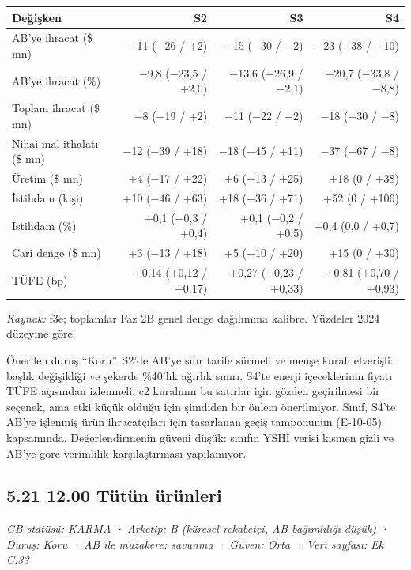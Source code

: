 \begin{longtable}[]{@{}lrrr@{}}
\toprule\noalign{}
\textbf{Değişken} & \textbf{S2} & \textbf{S3} & \textbf{S4} \\
\midrule\noalign{}
\endhead
\bottomrule\noalign{}
\endlastfoot
AB'ye ihracat (\$ mn) & −11 (−26 / +2) & −15 (−30 / −2) & −23 (−38 / −10) \\
AB'ye ihracat (\%) & −9,8 (−23,5 / +2,0) & −13,6 (−26,9 / −2,1) & −20,7 (−33,8 / −8,8) \\
Toplam ihracat (\$ mn) & −8 (−19 / +2) & −11 (−22 / −2) & −18 (−30 / −8) \\
Nihai mal ithalatı (\$ mn) & −12 (−39 / +18) & −18 (−45 / +11) & −37 (−67 / −8) \\
Üretim (\$ mn) & +4 (−17 / +22) & +6 (−13 / +25) & +18 (0 / +38) \\
İstihdam (kişi) & +10 (−46 / +63) & +18 (−36 / +71) & +52 (0 / +106) \\
İstihdam (\%) & +0,1 (−0,3 / +0,4) & +0,1 (−0,2 / +0,5) & +0,4 (0,0 / +0,7) \\
Cari denge (\$ mn) & +3 (−13 / +18) & +5 (−10 / +20) & +15 (0 / +30) \\
TÜFE (bp) & +0,14 (+0,12 / +0,17) & +0,27 (+0,23 / +0,33) & +0,81 (+0,70 / +0,93) \\
\end{longtable}

\endgroup

\emph{Kaynak:} \etiketT{} f3e; toplamlar Faz 2B genel denge dağılımına kalibre. Yüzdeler 2024 düzeyine göre.

Önerilen duruş ``Koru''. S2'de AB'ye sıfır tarife sürmeli ve menşe kuralı elverişli: başlık değişikliği ve şekerde \%40'lık ağırlık sınırı. S4'te enerji içeceklerinin fiyatı TÜFE açısından izlenmeli; c2 kuralının bu satırlar için gözden geçirilmesi bir seçenek, ama etki küçük olduğu için şimdiden bir önlem önerilmiyor. Sınıf, S4'te AB'ye işlenmiş ürün ihracatçıları için tasarlanan geçiş tamponunun (E-10-05) kapsamında. Değerlendirmenin güveni düşük: sınıfın YSHİ verisi kısmen gizli ve AB'ye göre verimlilik karşılaştırması yapılamıyor.

\hypertarget{nace_kartlar_10-12-521-1200-tuxfctuxfcn-uxfcruxfcnleri}{%
\subsection{5.21 12.00 Tütün ürünleri}\label{nace_kartlar_10-12-521-1200-tuxfctuxfcn-uxfcruxfcnleri}}

\emph{GB statüsü: KARMA · Arketip: B (küresel rekabetçi, AB bağımlılığı düşük) · Duruş: Koru · AB ile müzakere: savunma · Güven: Orta · Veri sayfası: Ek C.33}

